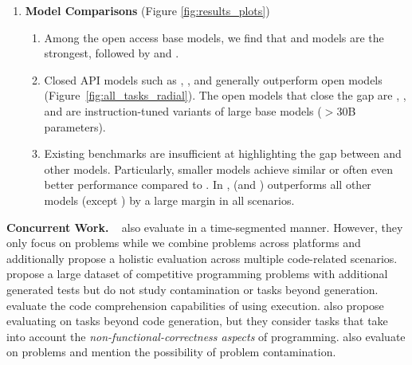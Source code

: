 \begin{enumerate}
    
    \item \textbf{Model Comparisons} (Figure \ref{fig:results_plots})
    \vspace{-6pt}
    \begin{enumerate}
    \itemsep-0.1em 
    \item Among the open access base models, we find that \llamabase{} and \deepseekbase{} models are the strongest, followed by \starcodertwobase{} and \cllamabase{}.
    \item Closed API models such as \gpts{}, \claude{}, and \gemini{} generally outperform open models (Figure~\ref{fig:all_tasks_radial}). The open models that close the gap are , \mixtral{}, and  are instruction-tuned variants of large base models ($> 30$\textsc{B} parameters). 
    \item Existing benchmarks are insufficient at highlighting the gap between \gptfour{} and other models. 
    Particularly, smaller models achieve similar or often even better performance compared to \gptfour{}. 
    In \livecodebench{}, \gptfour{} (and \gptfourturbo{}) outperforms all other models (except \claudeopus{}) by a large margin in all scenarios.
    
    \end{enumerate}
    
\end{enumerate}


\noindent \textbf{Concurrent Work.} 
~\citep{huang2023competition} also evaluate \llms{} in a time-segmented manner. 
However, they only focus on \codeforces{} problems while we combine problems across platforms 
and additionally propose a holistic evaluation across multiple code-related scenarios. 
~\citep{li2023taco} propose a large dataset of competitive programming problems with additional generated tests but do not study contamination or tasks beyond generation.
~\cite{liu2024codemind} evaluate the code comprehension capabilities of \llms{} using execution. \citep{singhal2024nofuneval} also propose evaluating \llms{} on tasks beyond code generation, but they consider tasks that take into account the \textit{non-functional-correctness aspects} of programming.
\citep{deepseek-coder} also evaluate \deepseek{} on \leetcode{} problems and mention the possibility of problem contamination.

